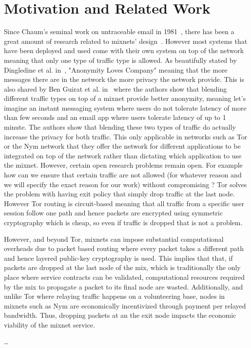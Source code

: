 \section{Motivation and Related Work}
\label{sec:related}

Since Chaum’s seminal work on untraceable email in 1981~\cite{chaum-mix}, there has been a great amount of research related to mixnets' design~\cite{piotrowska2017loopix, van2015vuvuzela, kwon2020xrd, lazar2018karaoke, cottrell1995mixmaster, alexopoulos2017MCMIX, chaum2016cmix, chaum-mix, danezis2003mixminion}. However most systems that have been deployed and used come with their own system on top of the network meaning that only one type of traffic type is allowed. As beautifully stated by Dingledine et al. in~\cite{dingledine2006anonymity}, "Anonymity Loves Company" meaning that the more messages there are in the network the more privacy the network provide. This is also shared by Ben Guirat et al. in~\cite{benguirat2023blending} where the authors show that blending different traffic types on top of a mixnet provide better anonymity, meaning let's imagine an instant messaging system where users do not tolerate latency of more than few seconds and an email app where users tolerate latency of up to 1 minute. The authors show that blending these two types of traffic do actually increase the privacy for both traffic. This only applicable in networks such as Tor or the Nym network that they offer the network for different applications to be integrated on top of the network rather than dictating which application to use the mixnet.
However, certain open research problems remain open. For example how can we ensure that certain traffic are not allowed (for whatever reason and we will specify the exact reason for our work) without compromising ?
Tor solves the problem with having exit policy that simply drop traffic at the last node. However Tor routing is circuit-based meaning that all traffic from a specific user session follow one path and hence packets are encrypted using symmetric cryptography which is cheap, so even if traffic is dropped that is not a problem.

However, and beyond Tor, mixnets can impose substantial computational
overheads due to packet based routing where every packet takes a different
path and hence layered public-key cryptography is used. This implies that
that, if packets are dropped at the last node of the mix, which is
traditionally the only place where service contracts can be validated,
computational resources required by the mix to propagate a packet to its
final node are wasted. Additionally, and unlike Tor where relaying traffic
happens on a volunteering base, nodes in mixnets such as Nym are
economically incentivized through payment per relayed bandwidth. Thus,
dropping packets at an the exit node impacts the economic viability of the
mixnet service.

\begin{questions}
%
        \item \ldots
%
\end{questions}
%




